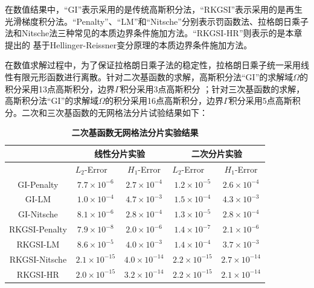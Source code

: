 在数值结果中，“GI”表示采用的是传统高斯积分法，“RKGSI”表示采用的是再生光滑梯度积分法。“Penalty”、“LM”和“Nitsche”分别表示罚函数法、拉格朗日乘子法和Nitsche法三种常见的本质边界条件施加方法。“RKGSI-HR”则表示的是本章提出的
基于Hellinger-Reissner变分原理的本质边界条件施加方法。\par
在数值求解过程中，为了保证拉格朗日乘子法的稳定性，拉格朗日乘子统一采用线性有限元形函数进行离散。针对二次基函数的求解，高斯积分法“GI”的求解域$\Omega$的积分采用13点高斯积分，边界$\Gamma$积分采用3点高斯积分
；针对三次基函数的求解，高斯积分法“GI”的求解域$\Omega$的积分采用16点高斯积分，边界$\Gamma$积分采用5点高斯积分。二次和三次基函数的无网格法分片试验结果如下：\par
\newpage
\begin{table}[H]
\caption{\textbf{二次基函数无网格法分片实验结果}}
\centering
\begin{tabular}{ccccc}
   \toprule
   $\quad$&\multicolumn{2}{c}{线性分片实验}&\multicolumn{2}{c}{二次分片实验}\\
   \midrule
   &$L_2$-Error$\quad$&$H_1$-Error&$L_2$-Error$\quad$&$H_1$-Error\\
   \midrule
   GI-Penalty&$7.7\times10^{-6}$&$2.7\times10^{-4}$&$1.2\times10^{-5}$&$2.6\times10^{-4}$\\
   GI-LM&$1.0\times10^{-4}$&$4.7\times10^{-3}$&$1.5\times10^{-4}$&$4.3\times10^{-3}$\\
   GI-Nitsche&$8.1\times10^{-6}$&$2.8\times10^{-4}$&$1.3\times10^{-5}$&$2.8\times10^{-4}$\\
  RKGSI-Penalty&$7.9\times10^{-8}$&$2.0\times10^{-6}$&$1.4\times10^{-7}$&$2.1\times10^{-6}$\\
  RKGSI-LM&$8.6\times10^{-5}$&$4.0\times10^{-3}$&$1.4\times10^{-4}$&$3.7\times10^{-3}$\\
  RKGSI-Nitsche&$2.1\times10^{-15}$&$4.0\times10^{-14}$&$2.2\times10^{-15}$&$2.7\times10^{-14}$\\
  RKGSI-HR&$2.0\times10^{-15}$&$3.2\times10^{-14}$&$2.2\times10^{-15}$&$2.1\times10^{-14}$\\
\bottomrule
\end{tabular}
\end{table}

